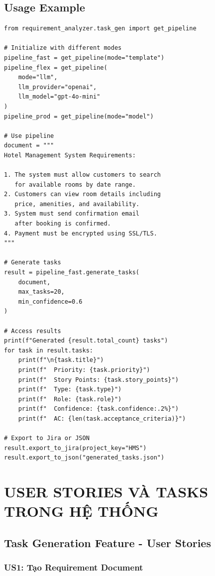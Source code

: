 \documentclass[12pt, a4paper]{report}
\begin{document}
\section{Usage Example}

\begin{tcolorbox}[colback=green!5]
\begin{lstlisting}
from requirement_analyzer.task_gen import get_pipeline

# Initialize with different modes
pipeline_fast = get_pipeline(mode="template")
pipeline_flex = get_pipeline(
    mode="llm",
    llm_provider="openai",
    llm_model="gpt-4o-mini"
)
pipeline_prod = get_pipeline(mode="model")

# Use pipeline
document = """
Hotel Management System Requirements:

1. The system must allow customers to search
   for available rooms by date range.
2. Customers can view room details including
   price, amenities, and availability.
3. System must send confirmation email
   after booking is confirmed.
4. Payment must be encrypted using SSL/TLS.
"""

# Generate tasks
result = pipeline_fast.generate_tasks(
    document,
    max_tasks=20,
    min_confidence=0.6
)

# Access results
print(f"Generated {result.total_count} tasks")
for task in result.tasks:
    print(f"\n{task.title}")
    print(f"  Priority: {task.priority}")
    print(f"  Story Points: {task.story_points}")
    print(f"  Type: {task.type}")
    print(f"  Role: {task.role}")
    print(f"  Confidence: {task.confidence:.2%}")
    print(f"  AC: {len(task.acceptance_criteria)}")

# Export to Jira or JSON
result.export_to_jira(project_key="HMS")
result.export_to_json("generated_tasks.json")
\end{lstlisting}
\end{tcolorbox}

\newpage

\chapter{USER STORIES VÀ TASKS TRONG HỆ THỐNG}

\section{Task Generation Feature - User Stories}

\subsection{US1: Tạo Requirement Document}
\end{document}
